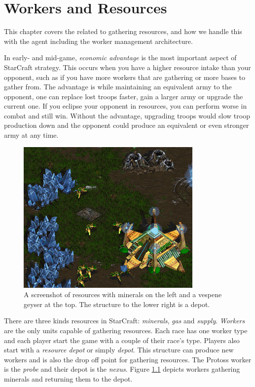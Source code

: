 \chapter{Workers and Resources}
\label{ch:resources}
This chapter covers the related to gathering resources, and how we handle this with the agent including the worker management architecture. 

In early- and mid-game, \emph{economic advantage} is the most important aspect of StarCraft strategy. This occurs when you have a higher resource intake than your opponent, such as if you have more workers that are gathering or more bases to gather from. The advantage is while maintaining an equivalent army to the opponent, one can replace lost troops faster, gain a larger army or upgrade the current one. If you eclipse your opponent in resources, you can perform worse in combat and still win. Without the advantage, upgrading troops would slow troop production down and the opponent could produce an equivalent or even stronger army at any time.

\begin{figure}
	\centering
	\includegraphics{figures/Resources}
	\caption{A screenshot of resources with minerals on the left and a vespene geyser at the top. The structure to the lower right is a depot.}
	\label{fig:resources}
\end{figure}

There are three kinds resources in StarCraft: \emph{minerals}, \emph{gas} and \emph{supply}. \emph{Workers} are the only units capable of gathering resources. Each race has one worker type and each player start the game with a couple of their race's type. Players also start with a \emph{resource depot} or simply \emph{depot}. This structure can produce new workers and is also the drop off point for gathering resources. The Protoss worker is the \emph{probe} and their depot is the \emph{nexus}. Figure \ref{fig:resources} depicts workers gathering minerals and returning them to the depot.

